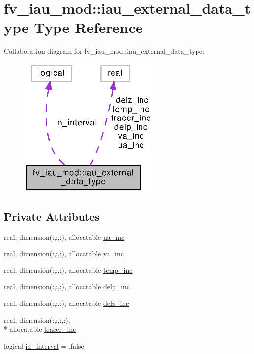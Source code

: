 \section{fv\-\_\-iau\-\_\-mod\-:\-:iau\-\_\-external\-\_\-data\-\_\-type Type Reference}
\label{structfv__iau__mod_1_1iau__external__data__type}


Collaboration diagram for fv\-\_\-iau\-\_\-mod\-:\-:iau\-\_\-external\-\_\-data\-\_\-type\-:
\nopagebreak
\begin{figure}[H]
\begin{center}
\leavevmode
\includegraphics[width=197pt]{structfv__iau__mod_1_1iau__external__data__type__coll__graph}
\end{center}
\end{figure}
\subsection*{Private Attributes}
\begin{DoxyCompactItemize}
\item 
real, dimension(\-:,\-:,\-:), allocatable \hyperlink{structfv__iau__mod_1_1iau__external__data__type_aa2120844d59c8df335cdca70569a5ff8}{ua\-\_\-inc}
\item 
real, dimension(\-:,\-:,\-:), allocatable \hyperlink{structfv__iau__mod_1_1iau__external__data__type_a761119157387b5d60cccfc17d7dac1a6}{va\-\_\-inc}
\item 
real, dimension(\-:,\-:,\-:), allocatable \hyperlink{structfv__iau__mod_1_1iau__external__data__type_ac17e810cbf4df80afa94d067862f4b02}{temp\-\_\-inc}
\item 
real, dimension(\-:,\-:,\-:), allocatable \hyperlink{structfv__iau__mod_1_1iau__external__data__type_adf2ef6258e65251b6d23476fb51401d2}{delp\-\_\-inc}
\item 
real, dimension(\-:,\-:,\-:), allocatable \hyperlink{structfv__iau__mod_1_1iau__external__data__type_af520a7af929ab51c9f94793238378470}{delz\-\_\-inc}
\item 
real, dimension(\-:,\-:,\-:,\-:), \\*
allocatable \hyperlink{structfv__iau__mod_1_1iau__external__data__type_af04840a19fc71d68eaeddceac0e0012a}{tracer\-\_\-inc}
\item 
logical \hyperlink{structfv__iau__mod_1_1iau__external__data__type_a7692cd433fd2b8dfc4933e78cf447828}{in\-\_\-interval} = .false.
\end{DoxyCompactItemize}


